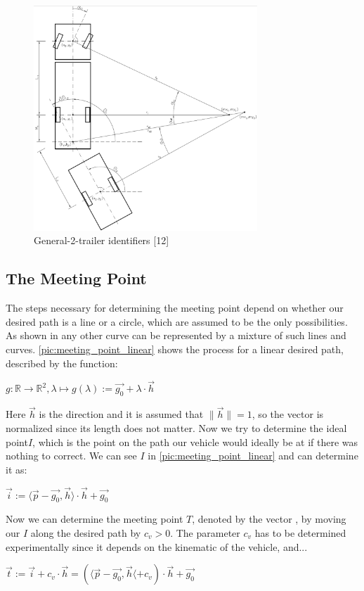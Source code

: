 \begin{figure}[h]
\centering
\includegraphics[width=0.75\textwidth]{./Chapters/Figures/vehicle_kinematic.png}
\caption{General-2-trailer identifiers [12] \label{pic:vehicle_kinematic}}
\end{figure}

\subsection{The Meeting Point}
\label{sec:meeting_point}

The steps necessary for determining the meeting point depend on whether our desired path is a line or a circle, which are assumed to be the only possibilities. As shown in \cite{12} any other curve can be represented by a mixture of such lines and curves.
\ref{pic:meeting_point_linear} shows the process for a linear desired path, described by the function:
\begin{center}
$g:\mathbb{R} \to \mathbb{R}^2 , \lambda \mapsto g(\lambda ) := \vec{g_0} + \lambda \cdot \vec{h}$
\end{center}
Here $\vec{h}$ is the direction and it is assumed that $\|\vec{h}\|=1$, so the vector is normalized since its length does not matter. Now we try to determine the ideal point$I$, which is the point on the path our vehicle would ideally be at if there was nothing to correct. We can see $I$ in \ref{pic:meeting_point_linear} and can determine it as:
\begin{center}
$\vec{i}:= \langle \vec{p}-\vec{g_0}, \vec{h} \rangle \cdot \vec{h} + \vec{g_0}$
\end{center}
Now we can determine the meeting point $T$, denoted by the vector , by moving our $I$ along the desired path by $c_v>0$. The parameter $c_v$ has to be determined experimentally since it depends on the kinematic of the vehicle, and...
\begin{center}
$\vec{t}:=\vec{i}+c_v \cdot \vec{h} = ( \langle \vec{p} - \vec{g_0}, \vec{h} \langle + c_v) \cdot \vec{h} + \vec{g_0}$
\end{center}

